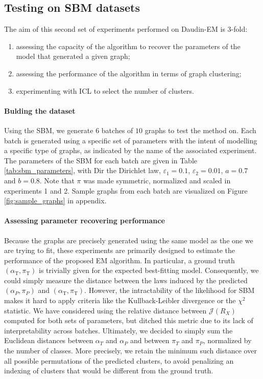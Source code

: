 \documentclass[switch, 12pt]{article}
\begin{document}
\begin{multicols}{2}
    \subsection{Testing on SBM datasets}

    The aim of this second set of experiments performed on Daudin-EM is 3-fold:
    \begin{enumerate}
        \item assessing the capacity of the algorithm to recover the parameters of the model that generated a given graph;
        \item assessing the performance of the algorithm in terms of graph clustering;
        \item experimenting with ICL to select the number of clusters.
    \end{enumerate}


    \paragraph{Bulding the dataset} Using the SBM, we generate 6 batches of $10$ graphs to test the method on. Each batch is generated using a specific set of parameters with the intent of modelling a specific type of graphs, as indicated by the name of the associated experiment. The parameters of the SBM for each batch are given in Table \ref{tab:sbm_parameters}, with $\mathrm{Dir}$ the Dirichlet law, $\varepsilon_1 = 0.1$, $\varepsilon_2 = 0.01$, $a = 0.7$ and $b = 0.8$. Note that $\pi$ was made symmetric, normalized and scaled in experiments 1 and 2. Sample graphs from each batch are visualized on Figure \ref{fig:sample_graphs} in appendix.

    \paragraph{Assessing parameter recovering performance} Because the graphs are precisely generated using the same model as the one we are trying to fit, these experiments are primarily designed to estimate the performance of the proposed EM algorithm. In particular, a ground truth $(\alpha_{\mathrm{T}}, \pi_{\mathrm{T}})$ is trivially given for the expected best-fitting model. Consequently, we could simply measure the distance between the laws induced by the predicted $(\alpha_P, \pi_P)$ and $(\alpha_{\mathrm{T}}, \pi_{\mathrm{T}})$. However, the intractability of the likelihood for SBM makes it hard to apply criteria like the Kullback-Leibler divergence or the $\chi^2$ statistic. We have considered using the relative distance between $\mathcal{J}(R_X)$ computed for both sets of parameters, but ditched this metric due to its lack of interpretability across batches. Ultimately, we decided to simply sum the Euclidean distances between $\alpha_T$ and $\alpha_P$ and between $\pi_T$ and $\pi_P$, normalized by the number of classes. More precisely, we retain the minimum such distance over all possible permutations of the predicted clusters, to avoid penalizing an indexing of clusters that would be different from the ground truth.


\end{multicols}
\end{document}
